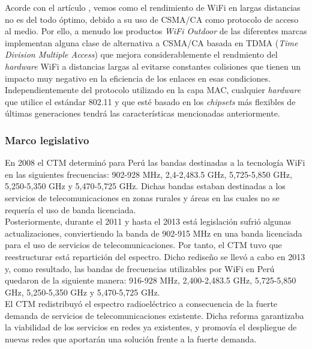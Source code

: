 Acorde con el artículo \cite{simo2014assessing}, vemos como el rendimiento de WiFi en largas distancias no es del todo óptimo, debido a su uso de CSMA/CA como protocolo de acceso al medio. Por ello, a menudo los productos \textit{WiFi Outdoor} de las diferentes marcas implementan alguna clase de alternativa  a CSMA/CA basada en TDMA (\textit{Time Division Multiple Access}) que mejora considerablemente el rendmiento del \textit{hardware} WiFi a distancias largas al evitarse constantes colisiones que tienen un impacto muy negativo en la eficiencia de los enlaces en esas condiciones. Independientemente del protocolo utilizado en la capa MAC, cualquier \textit{hardware} que utilice el estándar 802.11 y que esté basado en los \textit{chipsets} más flexibles de últimas generaciones tendrá las características mencionadas anteriormente. \\

\subsubsection{Marco legislativo}
En 2008 el CTM determinó para Perú las bandas destinadas a la tecnología WiFi en las siguientes frecuencias: 902-928 MHz, 2,4-2,483.5 GHz, 5,725-5,850 GHz, 5,250-5,350 GHz y 5,470-5,725 GHz. Dichas bandas estaban destinadas a los servicios de telecomunicaciones en zonas rurales y áreas en las cuales no se requería el uso de banda licenciada. \\

Posteriormente, durante el 2011 y hasta el 2013 está legislación sufrió algunas actualizaciones, conviertiendo la banda de 902-915 MHz en una banda licenciada para el uso de servicios de telecomunicaciones. Por tanto, el CTM tuvo que reestructurar está repartición del espectro. Dicho rediseño se llevó a cabo en 2013 y, como resultado, las bandas de frecuencias utilizables por WiFi en Perú quedaron de la siguiente manera: 916-928 MHz, 2,400-2,483.5 GHz, 5,725-5,850 GHz, 5,250-5,350 GHz y 5,470-5,725 GHz.\\

El CTM redistribuyó el espectro radioeléctrico a consecuencia de la fuerte demanda de servicios de telecomunicaciones existente. Dicha reforma garantizaba la viabilidad de los servicios en redes ya existentes, y promovía el despliegue de nuevas redes que aportarán una solución frente a la fuerte demanda. \\

		
